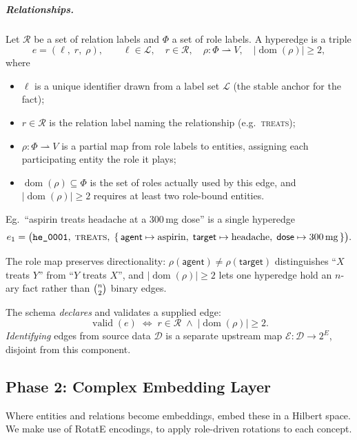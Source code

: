\documentclass[twoside,10pt]{article}
\begin{document}
\subparagraph{Relationships.} 
Let $\mathcal{R}$ be a set of relation labels and $\Phi$ a set of role labels.
A hyperedge is a triple
\[
  e = (\ell,\; r,\; \rho), \qquad
  \ell \in \mathcal{L}, \quad
  r \in \mathcal{R}, \quad
  \rho \colon \Phi \rightharpoonup V, \quad
  |\operatorname{dom}(\rho)| \geq 2,
\]
where
\begin{itemize}
  \item $\ell$ is a unique identifier drawn from a label set $\mathcal{L}$
        (the stable anchor for the fact);
  \item $r \in \mathcal{R}$ is the relation label naming the relationship
        (e.g.\ \textsc{treats});
  \item $\rho \colon \Phi \rightharpoonup V$ is a partial map from role labels to
        entities, assigning each participating entity the role it plays;
  \item $\operatorname{dom}(\rho) \subseteq \Phi$ is the set of roles actually
        used by this edge, and $|\operatorname{dom}(\rho)| \geq 2$ requires at
        least two role-bound entities.
\end{itemize}

Eg.~``aspirin treats headache at a 300\,mg dose'' is a single
hyperedge
\[
  e_1 = \bigl(\texttt{he\_0001},\; \textsc{treats},\;
  \{\, \mathsf{agent} \mapsto \text{aspirin},\;
       \mathsf{target} \mapsto \text{headache},\;
       \mathsf{dose} \mapsto \text{300\,mg} \,\}\bigr).
\]

The role map preserves directionality:
$\rho(\mathsf{agent}) \neq \rho(\mathsf{target})$ distinguishes ``$X$ treats $Y$''
from ``$Y$ treats $X$'', and $|\operatorname{dom}(\rho)| \geq 2$ lets one
hyperedge hold an $n$-ary fact rather than $\tbinom{n}{2}$ binary edges.

The schema \emph{declares} and validates a supplied edge:
\[
  \operatorname{valid}(e) \;\iff\; r \in \mathcal{R} \;\wedge\;
  |\operatorname{dom}(\rho)| \geq 2 .
\]
\emph{Identifying} edges from source data $\mathcal{D}$ is a separate upstream
map $\mathcal{E}\colon \mathcal{D} \to 2^{E}$, disjoint from this component.

\subsection{Phase 2: Complex Embedding Layer}
Where entities and relations become embeddings, embed these in a Hilbert space.
We make use of RotatE encodings, to apply role-driven rotations to each concept.
\end{document}
